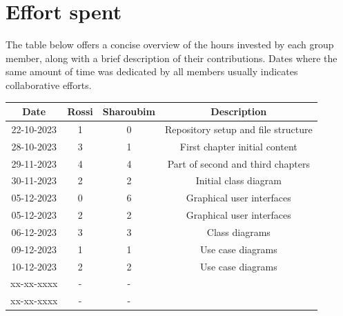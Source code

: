 \documentclass[12pt, a4paper]{report}
\begin{document}
\chapter{Effort spent}
    The table below offers a concise overview of the hours invested by each group member, along with a brief description of their contributions. 
    Dates where the same amount of time was dedicated by all members usually indicates collaborative efforts.
    \begin{table}[H]
        \centering
        \begin{tabular}{cccc}
            \textbf{Date}   & \textbf{Rossi}            & \textbf{Sharoubim}            & \textbf{Description}                          \\ \hline
            22-10-2023      & 1                         & 0                             & Repository setup and file structure           \\ 
            28-10-2023      & 3                         & 1                             & First chapter initial content                 \\ 
            29-11-2023      & 4                         & 4                             & Part of second and third chapters             \\
            30-11-2023      & 2                         & 2                             & Initial class diagram                         \\
            05-12-2023      & 0                         & 6                             & Graphical user interfaces                     \\
            05-12-2023      & 2                         & 2                             & Graphical user interfaces                     \\
            06-12-2023      & 3                         & 3                             & Class diagrams                                 \\
            09-12-2023      & 1                         & 1                             & Use case diagrams                             \\
            10-12-2023      & 2                         & 2                             & Use case diagrams                                              \\
            xx-xx-xxxx      & -                         & -                             &                                               \\
            xx-xx-xxxx      & -                         & -                             &                                               \\

\end{tabular}
\end{table}
\end{document}
